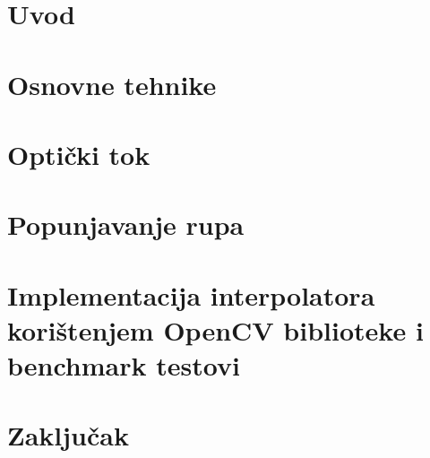 \documentclass[12pt]{report}
\newcommand{\ch}{\v{c}}
\newcommand{\sh}{\v{s}}
\begin{document}
\tableofcontents

\chapter{Uvod}


\chapter{Osnovne tehnike}


\chapter{Opti\ch ki tok}
%

\chapter{Popunjavanje rupa}
%

\chapter{Implementacija interpolatora kori\sh tenjem OpenCV biblioteke i benchmark testovi}

\chapter{Zaklju\ch ak}
\end{document}
